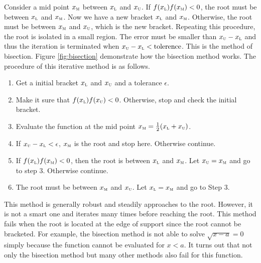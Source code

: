 Consider a mid point $x_\textsc{m}$ between  $x_\textsc{l}$ and $x_\textsc{u}$.  If $f(x_\textsc{l}) f(x_\textsc{m}) < 0$, the root must be between $x_\textsc{l}$ and $x_\textsc{m}$.  Now we have a new bracket $x_\textsc{l}$ and $x_\textsc{m}$.  Otherwise, the root must be between $x_\textsc{m}$ and $x_\textsc{u}$, which is the new bracket.  Repeating this procedure, the root is isolated in a small region. The error must be smaller than $x_\textsc{u}-x_\textsc{l}$ and thus the iteration is terminated when $x_\textsc{u}-x_\textsc{l} < \text{tolerence}$. This is the method of bisection.  Figure \ref{fig:bisection} demonstrate how the bisection method works. 
The procedure of this iterative method is  as follows.

\bigskip
\begin{center}
	\begin{myalgobox}
		\label{argo:bisection}
		
				\begin{minipage}{5.5in}
					\begin{enumerate}
\item Get a initial bracket $x_\textsc{l}$ and $x_\textsc{u}$ and a tolerance $\epsilon$.
\item Make it sure that $f(x_\textsc{l}) f(x_\textsc{u}) <0$.  Otherwise, stop and check the initial bracket.
\item Evaluate the function at the mid point $x_\textsc{m} = \frac{1}{2}(x_\textsc{l}+x_\textsc{u})$.
\item If $x_\textsc{u} - x_\textsc{l}< \epsilon$, $x_\textsc{m}$ is the root and stop here.  Otherwise continue.
\item If $f(x_\textsc{l}) f(x_\textsc{m}) < 0$, then the root is between $x_\textsc{l}$ and $x_\textsc{m}$.  Let $x_\textsc{u}=x_\textsc{m}$ and go to step 3.  Otherwise continue.
\item The root must be between $x_\textsc{m}$ and $x_\textsc{u}$.  Let $x_\textsc{l}=x_\textsc{m}$ and go to Step 3.
                    \end{enumerate}
                \end{minipage}
\end{myalgobox}
    \end{center}

This method  is generally robust and steadily approaches to the root. However, it is not a smart one and iterates many times before reaching the root.  
This method fails when the root is located at the edge of support since the root cannot be bracketed. For example, the bisection method is not able to solve $\sqrt{x-a}=0$ simply because the function cannot be evaluated for $x<a$. It turns out that not only the bisection method but many other methods also fail for this function.

